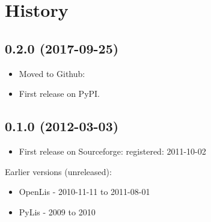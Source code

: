 \documentclass[letterpaper,10pt,english]{sphinxmanual}
\begin{document}
\section{History}
\label{\detokenize{history::doc}}\label{\detokenize{history:history}}

\subsection{0.2.0 (2017-09-25)}
\label{\detokenize{history:id1}}\begin{itemize}
\item {} 
Moved to Github: 

\item {} 
First release on PyPI.

\end{itemize}


\subsection{0.1.0 (2012-03-03)}
\label{\detokenize{history:id2}}\begin{itemize}
\item {} 
First release on Sourceforge:  registered: 2011-10-02

\end{itemize}

Earlier versions (unreleased):
\begin{itemize}
\item {} 
OpenLis - 2010-11-11 to 2011-08-01

\item {} 
PyLis - 2009 to 2010

\end{itemize}
\end{document}
